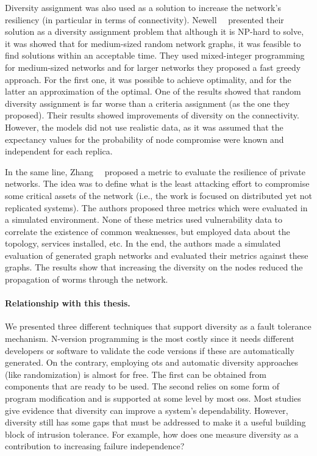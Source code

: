 Diversity assignment was also used as a solution to increase the network's resiliency (in particular in terms of connectivity).
Newell~\etal{}~\cite{Newell:2015} presented their solution as a diversity assignment problem that although it is NP-hard to solve, it was showed that for medium-sized random network graphs, it was feasible to find solutions within an acceptable time.
They used mixed-integer programming for medium-sized networks and for larger networks they proposed a fast greedy approach.
For the first one, it was possible to achieve optimality, and for the latter an approximation of the optimal.
One of the results showed that random diversity assignment is far worse than a criteria assignment (as the one they proposed).
Their results showed improvements of diversity on the connectivity.
However, the models did not use realistic data, as it was assumed that the expectancy values for the probability of node compromise were known and independent for each replica.


In the same line, Zhang~\etal{}~\cite{Zhang:2016} proposed a metric to evaluate the resilience of private networks.
The idea was to define what is the least attacking effort to compromise some critical assets of the network (i.e., the work is focused on distributed yet not replicated systems).
The authors proposed three metrics which were evaluated in a simulated environment.
None of these metrics used vulnerability data to correlate the existence of common weaknesses, but employed data about the topology, services installed, etc.
In the end, the authors made a simulated evaluation of generated graph networks and evaluated their metrics against these graphs. 
The results show that increasing the diversity on the nodes reduced the propagation of worms through the network.
 

\paragraph{Relationship with this thesis.}
We presented three different techniques that support diversity as a fault tolerance mechanism. 
N-version programming is the most costly since it needs different developers or software to validate the code versions if these are automatically generated.
On the contrary, employing \gls{ots} and automatic diversity approaches (like randomization) is almost for free. 
The first can be obtained from components that are ready to be used. 
The second relies on some form of program modification and is supported at some level by most \glspl{os}. 
Most studies give evidence that diversity can improve a system’s dependability.
However, diversity still has some gaps that must be addressed to make it a useful building block of intrusion tolerance. 
For example, how does one measure diversity as a contribution to increasing failure independence?


